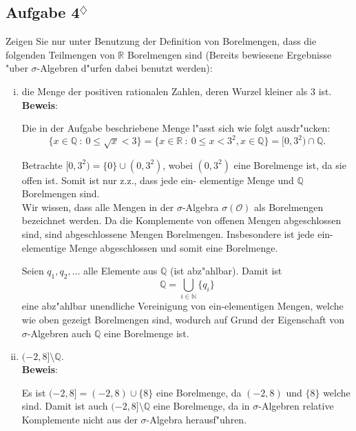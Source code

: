 \documentclass[11pt,a4paper,ngerman]{article}
\newcommand{\set}[1]{ \{ #1 \}}
\newcommand{\N}{\mathbb{N}}
\newcommand{\Q}{\mathbb{Q}}
\newcommand{\R}{\mathbb{R}}
\newcommand{\bigO}{\mathcal{O}}
\newcommand{\marcel}{$^\diamondsuit$}
\begin{document}
\subsection*{Aufgabe 4\marcel}

Zeigen Sie nur unter Benutzung der Definition von Borelmengen, dass die folgenden
Teilmengen von $\R$ Borelmengen sind (Bereits bewiesene Ergebnisse "uber
$\sigma$-Algebren d"urfen dabei benutzt werden):

\begin{enumerate}[(i)]
  \item die Menge der positiven rationalen Zahlen, deren Wurzel kleiner als $3$
    ist.\\

    \textbf{Beweis}:

    Die in der Aufgabe beschriebene Menge l"asst sich wie folgt ausdr"ucken: \[
      \set{x \in \Q\ :\ 0 \le \sqrt x < 3} =
      \set{x \in \R\ :\ 0 \le x < 3 ^ 2, x \in \Q} = [0, 3^2) \cap \Q.
    \]

    Betrachte $[0, 3^2) = \set{0} \cup (0, 3^2)$, wobei $(0, 3^2)$ eine
    Borelmenge ist, da sie offen ist. Somit ist nur z.z., dass jede ein-
    elementige Menge und $\Q$ Borelmengen sind. \\

    Wir wissen, dass alle Mengen in der $\sigma$-Algebra $\sigma(\bigO)$ als
    Borelmengen bezeichnet werden. Da die Komplemente von offenen Mengen
    abgeschlossen sind, sind abgeschlossene Mengen Borelmengen. Insbesondere ist
    jede ein-elementige Menge abgeschlossen und somit eine Borelmenge.

    Seien $q_1, q_2, \ldots$ alle Elemente aus $\Q$ (ist abz"ahlbar).
    Damit ist \[
      \Q = \bigcup_{i\in\N} \set{q_i}
    \]
    eine abz"ahlbar unendliche Vereinigung von ein-elementigen Mengen, welche
    wie oben gezeigt Borelmengen sind, wodurch auf Grund der Eigenschaft von
    $\sigma$-Algebren auch $\Q$ eine Borelmenge ist.

  \item $(-2, 8] \setminus \Q.$\\

    \textbf{Beweis}:

    Es ist $(-2, 8] = (-2, 8) \cup \set 8$ eine Borelmenge, da $(-2, 8)$ und
    $\set 8$ welche sind. Damit ist auch $(-2, 8] \setminus \Q$ eine Borelmenge,
    da in $\sigma$-Algebren relative Komplemente nicht aus der $\sigma$-Algebra
    herausf"uhren.

\end{enumerate}

\label{LastPage}
\end{document}
